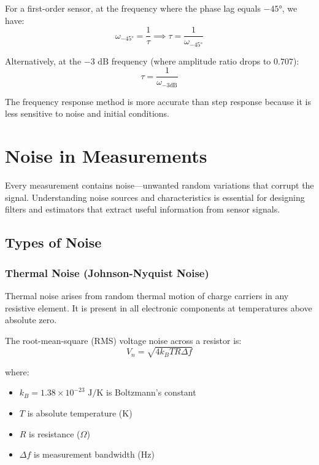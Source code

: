 For a first-order sensor, at the frequency where the phase lag equals $-45°$, we have:
\begin{equation}
\omega_{-45°} = \frac{1}{\tau} \implies \tau = \frac{1}{\omega_{-45°}}
\label{eq:freq_tau}
\end{equation}

Alternatively, at the $-3\text{ dB}$ frequency (where amplitude ratio drops to $0.707$):
\begin{equation}
\tau = \frac{1}{\omega_{-3\text{dB}}}
\end{equation}

The frequency response method is more accurate than step response because it is less sensitive to noise and initial conditions.

\section{Noise in Measurements}
\label{sec:noise}

Every measurement contains noise---unwanted random variations that corrupt the signal. Understanding noise sources and characteristics is essential for designing filters and estimators that extract useful information from sensor signals.

\subsection{Types of Noise}

\subsubsection{Thermal Noise (Johnson-Nyquist Noise)}

Thermal noise arises from random thermal motion of charge carriers in any resistive element. It is present in all electronic components at temperatures above absolute zero.

The root-mean-square (RMS) voltage noise across a resistor is:
\begin{equation}
V_n = \sqrt{4k_B T R \Delta f}
\label{eq:thermal_noise}
\end{equation}

where:
\begin{itemize}
    \item $k_B = 1.38 \times 10^{-23}\text{ J/K}$ is Boltzmann's constant
    \item $T$ is absolute temperature (K)
    \item $R$ is resistance ($\Omega$)
    \item $\Delta f$ is measurement bandwidth (Hz)
\end{itemize}

